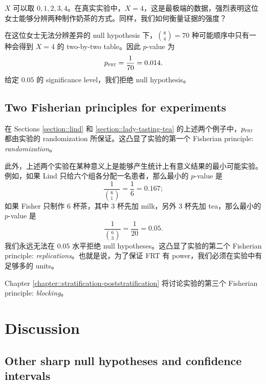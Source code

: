 $X$ 可以取 $0, 1, 2, 3, 4$。在真实实验中，$X = 4$，这是最极端的数据，强烈表明这位女士能够分辨两种制作奶茶的方式。同样，我们如何衡量证据的强度？


在这位女士无法分辨差异的 null hypothesis 下，$\binom{8}{4} = 70$ 种可能顺序中只有一种会得到 $X=4$ 的 two-by-two table。因此 $p$-value 为
$$
p_{\textsc{frt}} = \frac{1}{70} = 0.014.
$$
给定 $0.05$ 的 significance level，我们拒绝 null hypothesis。



\subsection{Two Fisherian principles for experiments}\label{sec::fisherian-principles-experiments}


在 Sections \ref{section::lind} 和 \ref{section::lady-tasting-tea} 的上述两个例子中，$p_{\textsc{frt}}$ 都由实验的 randomization 所保证。这凸显了实验的第一个 Fisherian principle: {\it randomization}。




 
 
 


此外，上述两个实验在某种意义上是能够产生统计上有意义结果的最小可能实验。例如，如果 Lind 只给六个组各分配一名患者，那么最小的 $p$-value 是
$$
\frac{1}{\binom{6}{1}}  =\frac{1}{6} = 0.167;
$$
如果 Fisher 只制作 $6$ 杯茶，其中 $3$ 杯先加 milk，另外 $3$ 杯先加 tea，那么最小的 $p$-value 是
$$
\frac{1}{\binom{6}{3}} = \frac{1}{20} = 0.05.
$$
我们永远无法在 $0.05$ 水平拒绝 null hypotheses。这凸显了实验的第二个 Fisherian principle: {\it replications}。也就是说，为了保证 FRT 有 power，我们必须在实验中有足够多的 units。

 

Chapter \ref{chapter::stratification-poststratification} 将讨论实验的第三个 Fisherian principle: {\it blocking}。


 

 

\section{Discussion}

\subsection{Other sharp null hypotheses and confidence intervals}\label{sec::frt-invert-interval}


